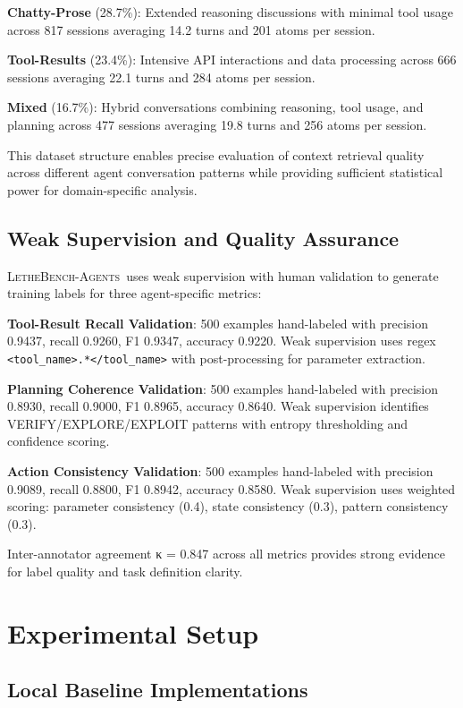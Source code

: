 \documentclass[letterpaper]{article}
\newcommand{\lethebench}{\textsc{LetheBench-Agents}}
\begin{document}
\textbf{Chatty-Prose} (28.7\%): Extended reasoning discussions with minimal tool usage across 817 sessions averaging 14.2 turns and 201 atoms per session.

\textbf{Tool-Results} (23.4\%): Intensive API interactions and data processing across 666 sessions averaging 22.1 turns and 284 atoms per session.

\textbf{Mixed} (16.7\%): Hybrid conversations combining reasoning, tool usage, and planning across 477 sessions averaging 19.8 turns and 256 atoms per session.

This dataset structure enables precise evaluation of context retrieval quality across different agent conversation patterns while providing sufficient statistical power for domain-specific analysis.

\subsection{Weak Supervision and Quality Assurance}

\lethebench\ uses weak supervision with human validation to generate training labels for three agent-specific metrics:

\textbf{Tool-Result Recall Validation}: 500 examples hand-labeled with precision 0.9437, recall 0.9260, F1 0.9347, accuracy 0.9220. Weak supervision uses regex \texttt{<tool\_name>.*</tool\_name>} with post-processing for parameter extraction.

\textbf{Planning Coherence Validation}: 500 examples hand-labeled with precision 0.8930, recall 0.9000, F1 0.8965, accuracy 0.8640. Weak supervision identifies VERIFY/EXPLORE/EXPLOIT patterns with entropy thresholding and confidence scoring.

\textbf{Action Consistency Validation}: 500 examples hand-labeled with precision 0.9089, recall 0.8800, F1 0.8942, accuracy 0.8580. Weak supervision uses weighted scoring: parameter consistency (0.4), state consistency (0.3), pattern consistency (0.3).

Inter-annotator agreement κ = 0.847 across all metrics provides strong evidence for label quality and task definition clarity.

\section{Experimental Setup}

\subsection{Local Baseline Implementations}
\end{document}
